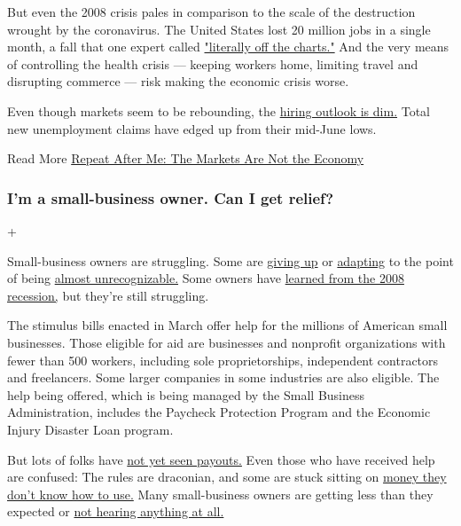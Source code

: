 But even the 2008 crisis pales in comparison to the scale of the
destruction wrought by the coronavirus. The United States lost 20
million jobs in a single month, a fall that one expert called
\href{https://www.nytimes.com/interactive/2020/05/08/business/economy/april-jobs-report.html}{"literally
off the charts."} And the very means of controlling the health crisis
--- keeping workers home, limiting travel and disrupting commerce ---
risk making the economic crisis worse.

Even though markets seem to be rebounding, the
\href{https://www.nytimes.com/2020/07/09/business/economy/unemployment-claims-coronavirus.html}{hiring
outlook is dim.} Total new unemployment claims have edged up from their
mid-June lows.

 Read More
\href{https://www.nytimes.com/2020/05/10/business/stock-market-economy-coronavirus.html}{Repeat
After Me: The Markets Are Not the Economy}

\hypertarget{im-a-small-business-owner-can-i-get-relief}{%
\subsubsection{I'm a small-business owner. Can I get
relief?}\label{im-a-small-business-owner-can-i-get-relief}}

+

Small-business owners are struggling. Some are
\href{https://www.nytimes.com/2020/07/13/business/small-businesses-coronavirus.html}{giving
up} or
\href{https://www.nytimes.com/2020/06/26/business/small-business-coronavirus-survival.html}{adapting}
to the point of being
\href{https://www.nytimes.com/2020/05/18/business/small-business-coronavirus-pandemic-mikes-organic.html}{almost
unrecognizable.} Some owners have
\href{https://www.nytimes.com/2020/06/23/business/coronavirus-great-recession-2008-lessons.html}{learned
from the 2008 recession,} but they're still struggling.

The stimulus bills enacted in March offer help for the millions of
American small businesses. Those eligible for aid are businesses and
nonprofit organizations with fewer than 500 workers, including sole
proprietorships, independent contractors and freelancers. Some larger
companies in some industries are also eligible. The help being offered,
which is being managed by the Small Business Administration, includes
the Paycheck Protection Program and the Economic Injury Disaster Loan
program.

But lots of folks have
\href{https://www.nytimes.com/interactive/2020/05/07/business/small-business-loans-coronavirus.html}{not
yet seen payouts.} Even those who have received help are confused: The
rules are draconian, and some are stuck sitting on
\href{https://www.nytimes.com/2020/05/02/business/economy/loans-coronavirus-small-business.html}{money
they don't know how to use.} Many small-business owners are getting less
than they expected or
\href{https://www.nytimes.com/2020/06/10/business/Small-business-loans-ppp.html}{not
hearing anything at all.}

